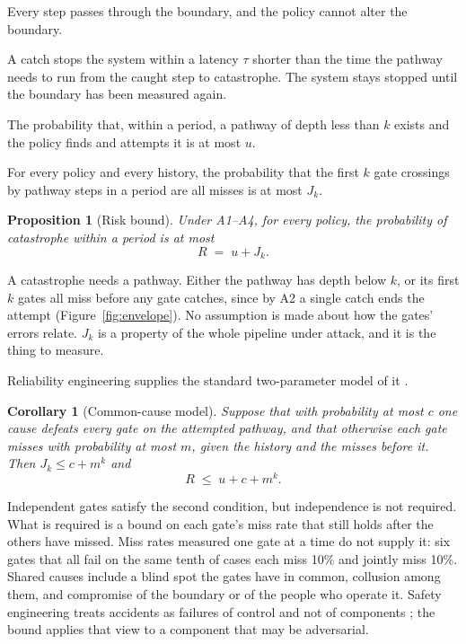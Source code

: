 \documentclass[10pt,twocolumn,letterpaper]{article}
\newtheorem{proposition}{Proposition}
\newtheorem{corollary}{Corollary}
\theoremstyle{definition}
\begin{document}
\begin{description}[leftmargin=1.3em,labelindent=0pt,itemsep=2pt,topsep=3pt]
\item[A1 (Mediation).] Every step passes through the boundary, and the policy cannot alter the boundary.
\item[A2 (Halt on catch).] A catch stops the system within a latency $\tau$ shorter than the time the pathway needs to run from the caught step to catastrophe. The system stays stopped until the boundary has been measured again.
\item[A3 (Coverage).] The probability that, within a period, a pathway of depth less than $k$ exists and the policy finds and attempts it is at most $u$.
\item[A4 (Joint miss).] For every policy and every history, the probability that the first $k$ gate crossings by pathway steps in a period are all misses is at most $J_{k}$.
\end{description}

\begin{proposition}[Risk bound]
\label{prop:reach}
Under A1--A4, for every policy, the probability of catastrophe within a period is at most
\[
R\;=\;u+J_{k}.
\]
\end{proposition}

A catastrophe needs a pathway. Either the pathway has depth below $k$, or its first $k$ gates all miss before any gate catches, since by A2 a single catch ends the attempt (Figure~\ref{fig:envelope}). No assumption is made about how the gates' errors relate. $J_{k}$ is a property of the whole pipeline under attack, and it is the thing to measure.

Reliability engineering supplies the standard two-parameter model of it \cite{fleming,mosleh}.

\begin{corollary}[Common-cause model]
\label{cor:beta}
Suppose that with probability at most $c$ one cause defeats every gate on the attempted pathway, and that otherwise each gate misses with probability at most $m$, given the history and the misses before it. Then $J_{k}\le c+m^{k}$ and
\[
R\;\le\;u+c+m^{k}.
\]
\end{corollary}

Independent gates satisfy the second condition, but independence is not required. What is required is a bound on each gate's miss rate that still holds after the others have missed. Miss rates measured one gate at a time do not supply it: six gates that all fail on the same tenth of cases each miss 10\% and jointly miss 10\%. Shared causes include a blind spot the gates have in common, collusion among them, and compromise of the boundary or of the people who operate it. Safety engineering treats accidents as failures of control and not of components \cite{leveson,reason}; the bound applies that view to a component that may be adversarial.
\end{document}
